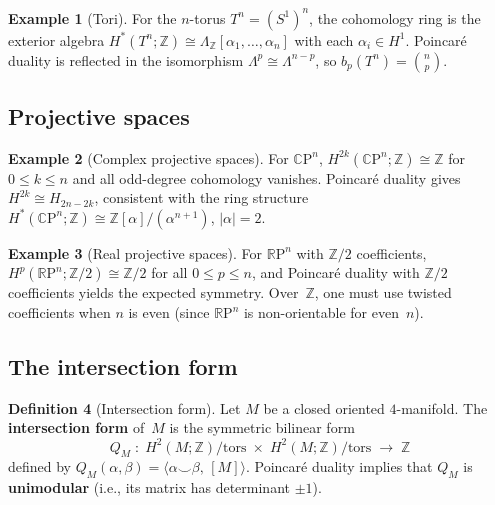 \documentclass[12pt,a4paper,openany]{book}
\theoremstyle{definition}
\newtheorem{definition}{Definition}[chapter]
\newtheorem{example}[definition]{Example}
\theoremstyle{plain}
\theoremstyle{remark}
\newcommand{\Z}{\mathbb{Z}}
\newcommand{\RP}{\mathbb{R}\mathrm{P}}
\newcommand{\CP}{\mathbb{C}\mathrm{P}}
\newcommand{\abs}[1]{\left|#1\right|}
\begin{document}
\begin{example}[Tori]
For the $n$-torus $T^n=(S^1)^n$, the cohomology ring is the exterior
algebra $H^*(T^n;\Z)\cong\Lambda_\Z[\alpha_1,\dots,\alpha_n]$ with
each $\alpha_i\in H^1$.  Poincar\'e duality is reflected in the
isomorphism $\Lambda^p\cong\Lambda^{n-p}$, so
$b_p(T^n)=\binom{n}{p}$.
\end{example}

\subsection{Projective spaces}

\begin{example}[Complex projective spaces]
For $\CP^n$, $H^{2k}(\CP^n;\Z)\cong\Z$ for $0\le k\le n$ and all
odd-degree cohomology vanishes.  Poincar\'e duality gives
$H^{2k}\cong H_{2n-2k}$, consistent with the ring structure
$H^*(\CP^n;\Z)\cong\Z[\alpha]/(\alpha^{n+1})$, $\abs{\alpha}=2$.
\end{example}

\begin{example}[Real projective spaces]
For $\RP^n$ with $\Z/2$ coefficients, $H^p(\RP^n;\Z/2)\cong\Z/2$
for all $0\le p\le n$, and Poincar\'e duality with $\Z/2$
coefficients yields the expected symmetry.  Over~$\Z$, one must use
twisted coefficients when $n$ is even (since $\RP^n$ is non-orientable
for even~$n$).
\end{example}

\subsection{The intersection form}\label{subsec:intersection-form}

\begin{definition}[Intersection form]
Let $M$ be a closed oriented $4$-manifold.  The \textbf{intersection
form} of~$M$ is the symmetric bilinear form
\[
  Q_M\;:\; H^2(M;\Z)/\mathrm{tors}\;\times\;
  H^2(M;\Z)/\mathrm{tors} \;\longrightarrow\;\Z
\]
defined by $Q_M(\alpha,\beta) = \langle \alpha\smile\beta,\,[M]\rangle$.
Poincar\'e duality implies that $Q_M$ is
\textbf{unimodular} (i.e., its matrix has
determinant $\pm1$).
\end{definition}
\end{document}
